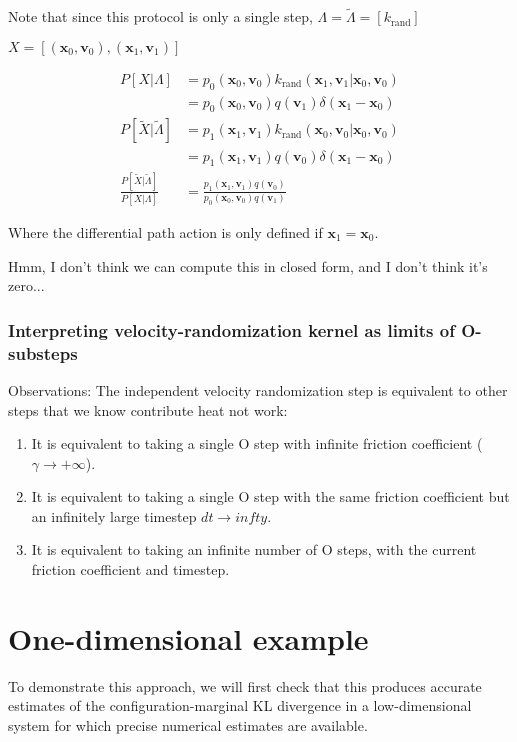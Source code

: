 \documentclass[11pt]{article}
\newcommand{\x}{\mathbf{x}}
\newcommand{\vel}{\mathbf{v}}
\begin{document}
Note that since this protocol is only a single step, $\Lambda = \tilde{\Lambda} = [k_\text{rand}]$

$X = [ (\x_0, \vel_0), (\x_1, \vel_1)]$

$$\begin{aligned}
P[X | \Lambda] &= p_0(\x_0, \vel_0) k_\text{rand}(\x_1, \vel_1 | \x_0, \vel_0)\\
&= p_0(\x_0, \vel_0) q(\vel_1) \delta(\x_1 - \x_0)\\
P[\tilde{X} | \tilde{\Lambda}] &= p_1(\x_1, \vel_1) k_\text{rand}(\x_0, \vel_0 | \x_0, \vel_0)\\
&= p_1(\x_1, \vel_1) q(\vel_0) \delta(\x_1 - \x_0)\\
\frac{P[\tilde{X} | \tilde{\Lambda}] }{P[X | \Lambda]} &= \frac{p_1(\x_1, \vel_1) q(\vel_0)}{p_0(\x_0, \vel_0) q(\vel_1)}
\end{aligned}$$

Where the differential path action is only defined if $\x_1 = \x_0$.

Hmm, I don't think we can compute this in closed form, and I don't think it's zero...

\subsubsection{Interpreting velocity-randomization kernel as limits of O-substeps}
Observations: The independent velocity randomization step is equivalent to other steps that we know contribute heat not work:
\begin{enumerate}
\item It is equivalent to taking a single O step with infinite friction coefficient ($\gamma \to +\infty$).
\item It is equivalent to taking a single O step with the same friction coefficient but an infinitely large timestep $d t \to infty$.
\item It is equivalent to taking an infinite number of O steps, with the current friction coefficient and timestep.
\end{enumerate}

\section{One-dimensional example}
To demonstrate this approach, we will first check that this produces accurate estimates of the configuration-marginal KL divergence in a low-dimensional system for which precise numerical estimates are available.
\end{document}
